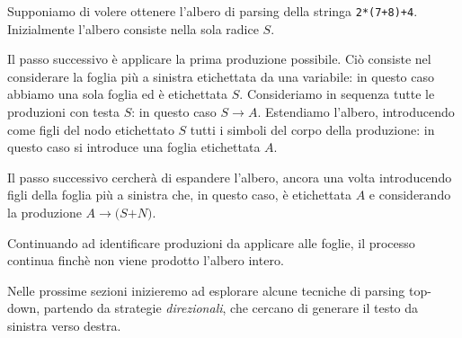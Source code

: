 Supponiamo di volere ottenere l'albero di parsing della stringa \verb;2*(7+8)+4;.
Inizialmente l'albero consiste nella sola radice $S$.



Il passo successivo è applicare la prima produzione possibile.
Ciò consiste nel considerare la foglia più a sinistra etichettata da una variabile: in questo caso abbiamo una sola
foglia ed è etichettata $S$.
Consideriamo in sequenza tutte le produzioni con testa $S$: in questo caso $S\to A$.
Estendiamo l'albero, introducendo come figli del nodo etichettato $S$ tutti i simboli del corpo della produzione: in
questo caso si introduce una foglia etichettata $A$.



Il passo successivo cercherà di espandere l'albero, ancora una volta introducendo figli della foglia più a sinistra che,
in questo caso, è etichettata $A$ e considerando la produzione $A\to \mathtt{(}S \mathtt{+} N)$.



Continuando ad identificare produzioni da applicare alle foglie, il processo continua finchè non viene prodotto l'albero
intero.



Nelle prossime sezioni inizieremo ad esplorare alcune tecniche di parsing top-down, partendo da strategie
\textit{direzionali}, che cercano di generare il testo da sinistra verso destra.


